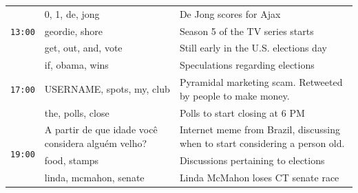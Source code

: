 \documentclass{sig-alternate}
\begin{document}
\begin{table}

\begin{center}
\small
\def\arraystretch{1.1}
\begin{tabular}{|p{.6cm}|p{2.5cm}|p{5cm}|}

\hline
\multirow{3}{*}{\texttt{13:00}} 	&  0, 1, de, jong 			& De Jong scores for Ajax \\ \cline{2-3} %
					   	& geordie, shore		& Season 5 of the TV series starts \\ \cline{2-3}
						& get, out, and, vote		& Still early in the U.S. elections day \\\hline

\multirow{3}{*}{\texttt{17:00}} 	&  if, obama, wins		& Speculations regarding elections \\ \cline{2-3}
					   	& USERNAME, spots, my, club		&  Pyramidal marketing scam. Retweeted by people to make money.  \\ \cline{2-3}
						& the, polls, close		& Polls to start closing at 6 PM \\\hline %

\multirow{3}{*}{\texttt{19:00}} 	&  A partir de que idade voc\^{e} considera algu\'{e}m velho?		& Internet meme from Brazil, discussing when to start considering a person old. \\ \cline{2-3}
					   	& food, stamps		& Discussions pertaining to elections \\ \cline{2-3}
						& linda, mcmahon, senate		&  Linda McMahon loses CT senate race \\\hline


\end{tabular}
\end{center}
\end{table}
\end{document}
